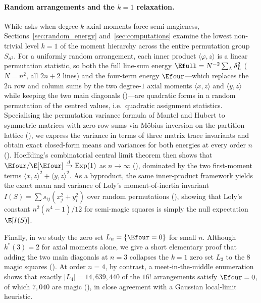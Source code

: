 \paragraph{Random arrangements and the $k=1$ relaxation.}
While  asks when degree-$k$ axial moments force semi-magicness, Sections~\ref{sec:random_energy} and~\ref{sec:computations} examine the lowest non-trivial level $k=1$ of the moment hierarchy across the entire permutation group $S_{n^2}$.
For a uniformly random arrangement, each inner product $\langle\varphi,z\rangle$ is a linear permutation statistic, so both the full line-sum energy $\Efull=N^{-2}\sum_L\delta_L^2$ ($N=n^2$, all $2n+2$ lines) and the four-term energy $\Efour$—which replaces the $2n$ row and column sums by the two degree-$1$ axial moments $\langle x,z\rangle$ and $\langle y,z\rangle$ while keeping the two main diagonals ()—are quadratic forms in a random permutation of the centred values, i.e.\ quadratic assignment statistics.
Specialising the permutation variance formula of Mantel \cite{mantel1967} and Hubert \cite{hubert1987assignment} to symmetric matrices with zero row sums via M\"obius inversion on the partition lattice (), we express the variance in terms of three matrix trace invariants and obtain exact closed-form means and variances for both energies at every order $n$ ().
Hoeffding's combinatorial central limit theorem then shows that $\Efour/\E[\Efour]\xrightarrow{d}\mathrm{Exp}(1)$ as $n\to\infty$ (), dominated by the two first-moment terms $\langle x,z\rangle^2+\langle y,z\rangle^2$.
As a byproduct, the same inner-product framework yields the exact mean and variance of Loly's moment-of-inertia invariant $I(S)=\sum s_{ij}(x_j^2+y_i^2)$ over random permutations (), showing that Loly's constant $n^2(n^4-1)/12$ for semi-magic squares \cite{loly2004invariance} is simply the null expectation $\E[I(S)]$.

Finally, in  we study the zero set $L_n = \{\Efour = 0\}$ for small $n$. Although $k^*(3)=2$ for axial moments alone, we give a short elementary proof that adding the two main diagonals at $n=3$ collapses the $k=1$ zero set $L_3$ to the $8$ magic squares (). At order $n=4$, by contrast, a meet-in-the-middle enumeration shows that exactly $|L_4|=14{,}639{,}440$ of the $16!$ arrangements satisfy $\Efour=0$, of which $7{,}040$ are magic (), in close agreement with a Gaussian local-limit heuristic.

